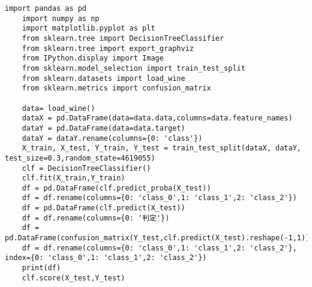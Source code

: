 \documentclass[12pt]{jarticle}
\begin{document}
\begin{lstlisting}[style = py,caption=レポート課題4]
    import pandas as pd
    import numpy as np
    import matplotlib.pyplot as plt
    from sklearn.tree import DecisionTreeClassifier
    from sklearn.tree import export_graphviz
    from IPython.display import Image
    from sklearn.model_selection import train_test_split
    from sklearn.datasets import load_wine
    from sklearn.metrics import confusion_matrix
    
    data= load_wine()
    dataX = pd.DataFrame(data=data.data,columns=data.feature_names)
    dataY = pd.DataFrame(data=data.target)
    dataY = dataY.rename(columns={0: 'class'})
    X_train, X_test, Y_train, Y_test = train_test_split(dataX, dataY, test_size=0.3,random_state=4619055)
    clf = DecisionTreeClassifier()
    clf.fit(X_train,Y_train)
    df = pd.DataFrame(clf.predict_proba(X_test))
    df = df.rename(columns={0: 'class_0',1: 'class_1',2: 'class_2'})
    df = pd.DataFrame(clf.predict(X_test))
    df = df.rename(columns={0: '判定'})
    df = pd.DataFrame(confusion_matrix(Y_test,clf.predict(X_test).reshape(-1,1)))
    df = df.rename(columns={0: 'class_0',1: 'class_1',2: 'class_2'}, index={0: 'class_0',1: 'class_1',2: 'class_2'})
    print(df)
    clf.score(X_test,Y_test) 
\end{lstlisting}

\end{document}
